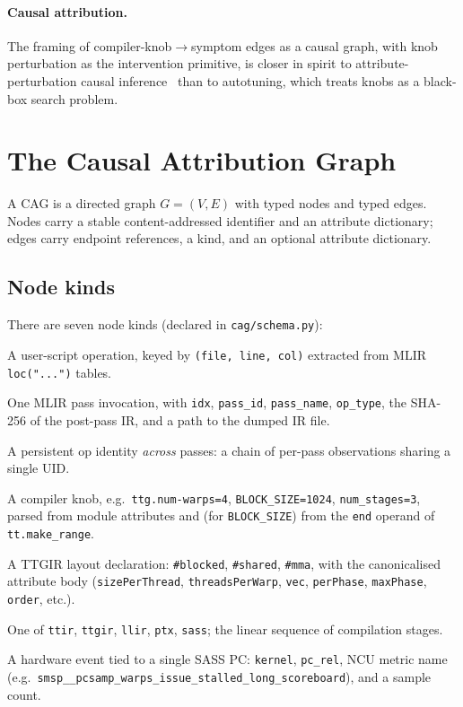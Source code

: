 \documentclass[10pt]{article}
\begin{document}
\paragraph{Causal attribution.} The framing of compiler-knob$\to$symptom edges as a causal graph, with knob perturbation as the intervention primitive, is closer in spirit to attribute-perturbation causal inference~\citep{pearl2009} than to autotuning, which treats knobs as a black-box search problem.

\section{The Causal Attribution Graph}\label{sec:schema}

A CAG is a directed graph $G = (V, E)$ with typed nodes and typed edges. Nodes carry a stable content-addressed identifier and an attribute dictionary; edges carry endpoint references, a kind, and an optional attribute dictionary.

\subsection{Node kinds}

There are seven node kinds (declared in \texttt{cag/schema.py}):
\begin{description}[leftmargin=1.2em,itemsep=0.15em,topsep=0.2em,labelsep=0.4em]
  \item[\texttt{SourceOp}] A user-script operation, keyed by \texttt{(file, line, col)} extracted from MLIR \texttt{loc("...")} tables.
  \item[\texttt{Pass}] One MLIR pass invocation, with \texttt{idx}, \texttt{pass\_id}, \texttt{pass\_name}, \texttt{op\_type}, the SHA-256 of the post-pass IR, and a path to the dumped IR file.
  \item[\texttt{IRNode}] A persistent op identity \emph{across} passes: a chain of per-pass observations sharing a single UID.
  \item[\texttt{Parameter}] A compiler knob, e.g.~\texttt{ttg.num-warps=4}, \texttt{BLOCK\_SIZE=1024}, \texttt{num\_stages=3}, parsed from module attributes and (for \texttt{BLOCK\_SIZE}) from the \texttt{end} operand of \texttt{tt.make\_range}.
  \item[\texttt{LayoutEncoding}] A TTGIR layout declaration: \texttt{\#blocked}, \texttt{\#shared}, \texttt{\#mma}, with the canonicalised attribute body (\texttt{sizePerThread}, \texttt{threadsPerWarp}, \texttt{vec}, \texttt{perPhase}, \texttt{maxPhase}, \texttt{order}, etc.).
  \item[\texttt{Stage}] One of \texttt{ttir}, \texttt{ttgir}, \texttt{llir}, \texttt{ptx}, \texttt{sass}; the linear sequence of compilation stages.
  \item[\texttt{Symptom}] A hardware event tied to a single SASS PC: \texttt{kernel}, \texttt{pc\_rel}, NCU metric name (e.g.~\texttt{smsp\_\_pcsamp\_warps\_issue\_stalled\_long\_scoreboard}), and a sample count.
\end{description}
\end{document}
